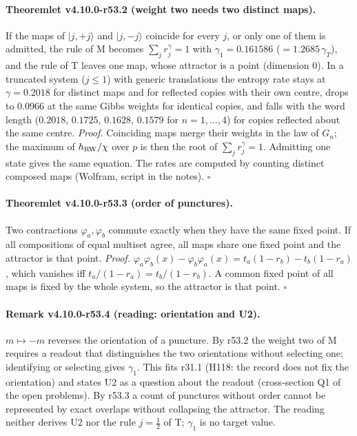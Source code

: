 \paragraph{Theoremlet v4.10.0-r53.2 (weight two needs two distinct maps).}
If the maps of \(|j,+j\rangle\) and \(|j,-j\rangle\) coincide for every \(j\), or only one of them is admitted, the rule of M becomes \(\sum_jr_j^{\gamma}=1\) with
\(\gamma_1=0.161586\) (\(=1.2685\,\gamma_T\)), and the rule of T leaves one map, whose attractor is a point (dimension 0).  In a truncated system
(\(j\le1\)) with generic translations the entropy rate stays at \(\gamma=0.2018\) for distinct maps and for reflected copies with their own centre,
drops to \(0.0966\) at the same Gibbs weights for identical copies, and falls with the word length (\(0.2018\), \(0.1725\), \(0.1628\), \(0.1579\) for
\(n=1,\dots,4\)) for copies reflected about the same centre.
\emph{Proof.} Coinciding maps merge their weights in the law of \(G_n\); the maximum of \(h_{\rm RW}/\chi\) over \(p\) is then the root of \(\sum_jr_j^{\gamma}=1\).
Admitting one state gives the same equation.  The rates are computed by counting distinct composed maps (Wolfram, script in the notes).  \(\square\)

\paragraph{Theoremlet v4.10.0-r53.3 (order of punctures).}
Two contractions \(\varphi_a,\varphi_b\) commute exactly when they have the same fixed point.  If all compositions of equal multiset agree, all maps
share one fixed point and the attractor is that point.
\emph{Proof.} \(\varphi_a\varphi_b(x)-\varphi_b\varphi_a(x)=t_a(1-r_b)-t_b(1-r_a)\), which vanishes iff \(t_a/(1-r_a)=t_b/(1-r_b)\).  A common fixed point of all maps
is fixed by the whole system, so the attractor is that point.  \(\square\)

\paragraph{Remark v4.10.0-r53.4 (reading: orientation and U2).}
\(m\mapsto-m\) reverses the orientation of a puncture.  By r53.2 the weight two of M requires a readout that distinguishes the two orientations
without selecting one; identifying or selecting gives \(\gamma_1\).  This fits r31.1 (H118: the record does not fix the orientation) and states U2 as a
question about the readout (cross-section Q1 of the open problems).  By r53.3 a count of punctures without order cannot be represented by exact
overlaps without collapsing the attractor.  The reading neither derives U2 nor the rule \(j=\tfrac12\) of T; \(\gamma_1\) is no target value.

